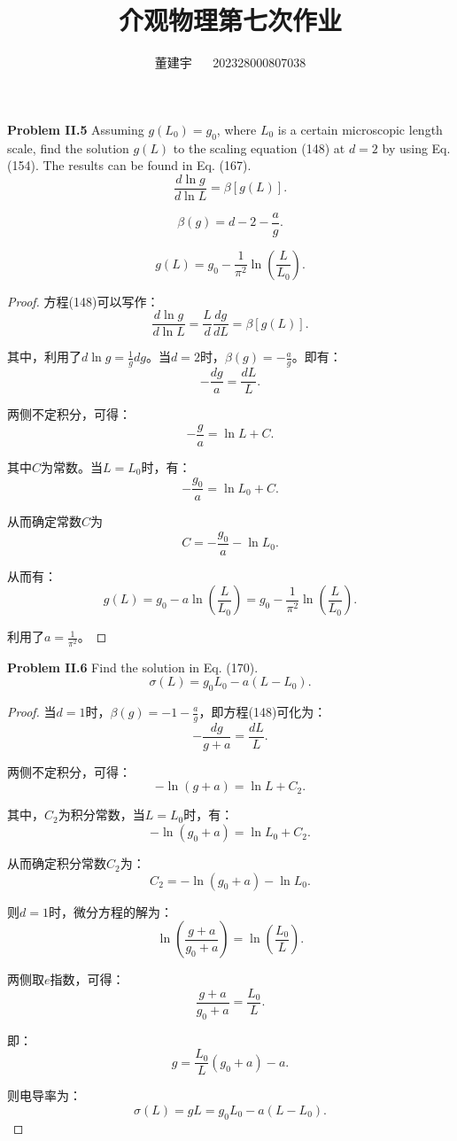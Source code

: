 \documentclass[reqno,a4paper,12pt]{amsart}
\title{介观物理第七次作业}
\author{董建宇 ~~ 202328000807038}
\begin{document}
\maketitle
\titleformat{\section}[hang]{\small}{\thesection}{0.8em}{}{}
\titleformat{\subsection}[hang]{\small}{\thesubsection}{0.8em}{}{}

\textbf{Problem II.5} Assuming $g(L_0) = g_0$, where $L_0$ is a certain microscopic length scale, find the solution $g(L)$ to the scaling equation (148) at $d=2$ by using Eq. (154). The results can be found in Eq. (167).
\[
	\frac{d\ln g}{d \ln L} = \beta[g(L)]. \tag{148}
\]

\[
	\beta(g) = d-2-\frac{a}{g}. \tag{154}
\]

\[
	g(L) = g_0 - \frac{1}{\pi^2} \ln \left( \frac{L}{L_0} \right). \tag{167}
\]

\begin{proof}
方程(148)可以写作：
\[
	\frac{d\ln g}{d\ln L} = \frac{L}{d} \frac{dg}{dL} = \beta[g(L)].
\]

其中，利用了$d\ln g = \frac{1}{g}dg$。当$d=2$时，$\beta(g) = -\frac{a}{g}$。即有：
\[
	-\frac{dg}{a} = \frac{dL}{L}.
\]

两侧不定积分，可得：
\[
	-\frac{g}{a} = \ln L + C.
\]

其中$C$为常数。当$L=L_0$时，有：
\[
	-\frac{g_0}{a} = \ln L_0 + C.
\]

从而确定常数$C$为
\[
	C = -\frac{g_0}{a} - \ln L_0.
\]

从而有：
\[
	g(L) = g_0 - a\ln \left( \frac{L}{L_0} \right) = g_0 - \frac{1}{\pi^2} \ln \left( \frac{L}{L_0} \right).
\]

利用了$a = \frac{1}{\pi^2}$。
\end{proof}

\textbf{Problem II.6} Find the solution in Eq. (170).
\[
	\sigma(L) = g_0 L_0 - a(L-L_0). \tag{170}
\]

\begin{proof}
当$d=1$时，$\beta(g) = -1-\frac{a}{g}$，即方程(148)可化为：
\[
	-\frac{dg}{g+a} = \frac{dL}{L}.
\]

两侧不定积分，可得：
\[
	-\ln(g+a) = \ln L + C_2.
\]

其中，$C_2$为积分常数，当$L=L_0$时，有：
\[
	-\ln(g_0+a) = \ln L_0 + C_2.
\]

从而确定积分常数$C_2$为：
\[
	C_2 = -\ln(g_0+a) - \ln L_0.
\]

则$d=1$时，微分方程的解为：
\[
	\ln \left( \frac{g+a}{g_0+a} \right) = \ln \left( \frac{L_0}{L} \right).
\]

两侧取$e$指数，可得：
\[
	\frac{g+a}{g_0+a} = \frac{L_0}{L}.
\]

即：
\[
	g = \frac{L_0}{L}(g_0+a) - a.
\]

则电导率为：
\[
	\sigma(L) = gL = g_0L_0 - a(L-L_0).
\]
\end{proof}
\end{document}
